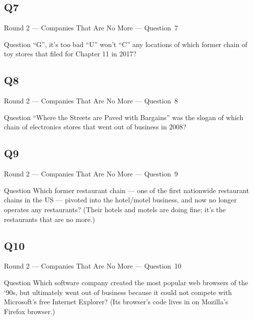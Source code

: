 \documentclass[11pt]{beamer}
\begin{document}
\subsection*{Q7}
\begin{frame}[t]{Round 2 --- Companies That Are No More --- \mbox{Question 7}}
    \vspace{-0.5em}
    \begin{block}{Question}
        ``G'', it's too bad ``U'' won't ``C'' any locations of which former chain of toy stores that filed for Chapter 11 in 2017?
    \end{block}
\end{frame}
\subsection*{Q8}
\begin{frame}[t]{Round 2 --- Companies That Are No More --- \mbox{Question 8}}
    \vspace{-0.5em}
    \begin{block}{Question}
        ``Where the Streets are Paved with Bargains'' was the slogan of which chain of electronics stores that went out of business in 2008?
    \end{block}
\end{frame}
\subsection*{Q9}
\begin{frame}[t]{Round 2 --- Companies That Are No More --- \mbox{Question 9}}
    \vspace{-0.5em}
    \begin{block}{Question}
        Which former restaurant chain --- one of the first nationwide restaurant chains in the US --- pivoted into the hotel/motel business, and now no longer operates any restaurants? (Their hotels and motels are doing fine; it's the restaurants that are no more.)
    \end{block}
\end{frame}
\subsection*{Q10}
\begin{frame}[t]{Round 2 --- Companies That Are No More --- \mbox{Question 10}}
    \vspace{-0.5em}
    \begin{block}{Question}
        Which software company created the most popular web browsers of the `90s, but ultimately went out of business because it could not compete with Microsoft's free Internet Explorer? (Its browser's code lives in on Mozilla's Firefox browser.)
    \end{block}
\end{frame}
\end{document}
